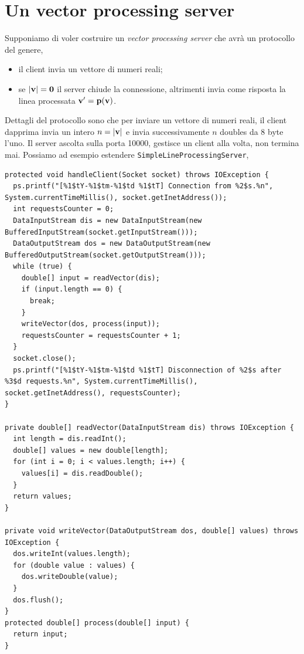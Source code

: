 \documentclass[\fontsizeclass,twocolumn]{\classname}
\theoremstyle{definition}
\theoremstyle{definition}
\begin{document}
\section{Un vector processing server}

Supponiamo di voler costruire un \emph{vector processing server} che avrà un
protocollo del genere,
\begin{itemize}
    \item il client invia un vettore di numeri reali;
    \item se $|\bf{v}| = \bf{0}$ il server chiude la connessione, altrimenti
        invia come risposta la linea processata $\bf{v}^\prime = p(\bf v)$.
\end{itemize}

Dettagli del protocollo sono che per inviare un vettore di numeri reali, il
client dapprima invia un intero $n = |\bf v|$ e invia successivamente $n$
doubles da 8 byte l'uno. Il server ascolta sulla porta 10000, gestisce un
client alla volta, non termina mai. Possiamo ad esempio estendere
\texttt{SimpleLineProcessingServer},

\begin{lstlisting}
protected void handleClient(Socket socket) throws IOException {
  ps.printf("[%1$tY-%1$tm-%1$td %1$tT] Connection from %2$s.%n", System.currentTimeMillis(), socket.getInetAddress());
  int requestsCounter = 0;
  DataInputStream dis = new DataInputStream(new BufferedInputStream(socket.getInputStream()));
  DataOutputStream dos = new DataOutputStream(new BufferedOutputStream(socket.getOutputStream()));
  while (true) {
    double[] input = readVector(dis);
    if (input.length == 0) {
      break;
    }
    writeVector(dos, process(input));
    requestsCounter = requestsCounter + 1;
  }
  socket.close();
  ps.printf("[%1$tY-%1$tm-%1$td %1$tT] Disconnection of %2$s after %3$d requests.%n", System.currentTimeMillis(), socket.getInetAddress(), requestsCounter);
}

private double[] readVector(DataInputStream dis) throws IOException {
  int length = dis.readInt();
  double[] values = new double[length];
  for (int i = 0; i < values.length; i++) {
    values[i] = dis.readDouble();
  }
  return values;
}

private void writeVector(DataOutputStream dos, double[] values) throws IOException {
  dos.writeInt(values.length);
  for (double value : values) {
    dos.writeDouble(value);
  }
  dos.flush();
}
protected double[] process(double[] input) {
  return input;
}
\end{lstlisting}
\end{document}
